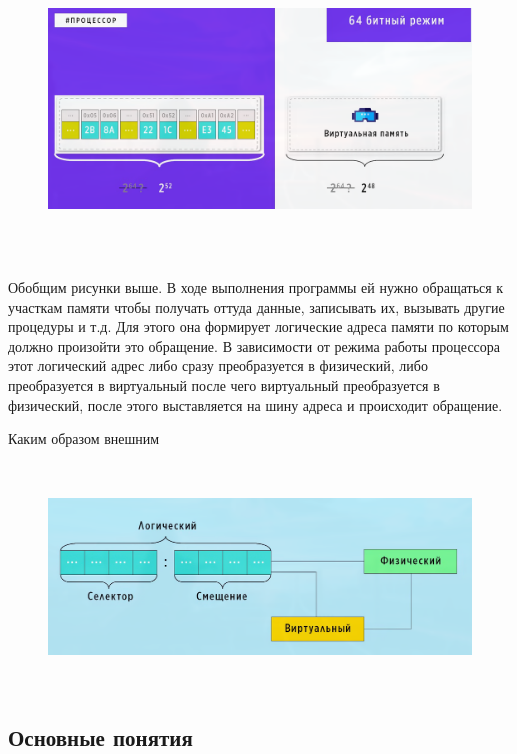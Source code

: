 	\begin{figure}[h]
		\centering
		\includegraphics[height=8cm]{img/2.8} 
		\captionsetup{font=footnotesize} 
		\caption*{} 
	\end{figure}
	
	\par Обобщим рисунки выше. В ходе выполнения программы ей нужно обращаться к участкам памяти чтобы получать оттуда данные, записывать их, вызывать другие процедуры и т.д. Для этого она формирует логические адреса памяти по которым должно произойти это обращение. В зависимости от режима работы процессора этот логический адрес либо сразу преобразуется в физический, либо преобразуется в виртуальный после чего виртуальный преобразуется в физический, после этого выставляется на шину адреса и происходит обращение. 
	
	\par Каким образом внешним  
	
	\begin{figure}[h]
		\centering
		\includegraphics[height=6cm]{img/2.9} 
		\captionsetup{font=footnotesize} 
		\caption*{} 
	\end{figure}
	
	\subsection{Основные понятия}
	
